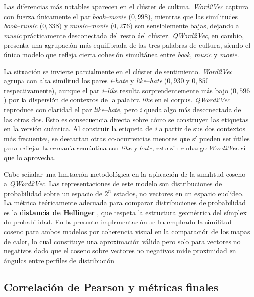 Las diferencias más notables aparecen en el clúster de cultura. \textit{Word2Vec} captura con fuerza únicamente el par \textit{book}--\textit{movie} ($0{,}998$), mientras que las similitudes \textit{book}--\textit{music} ($0{,}338$) y \textit{music}--\textit{movie} ($0{,}276$) son sensiblemente bajas, dejando a \textit{music} prácticamente desconectada del resto del clúster. \textit{QWord2Vec}, en cambio, presenta una agrupación más equilibrada de las tres palabras de cultura, siendo el único modelo que refleja cierta cohesión simultánea entre \textit{book}, \textit{music} y \textit{movie}.

La situación se invierte parcialmente en el clúster de sentimiento. \textit{Word2Vec} agrupa con alta similitud los pares \textit{i}--\textit{hate} y \textit{like}--\textit{hate} ($0{,}930$ y $0{,}850$ respectivamente), aunque el par \textit{i}--\textit{like} resulta sorprendentemente más bajo ($0{,}596$) por la dispersión de contextos de la palabra \textit{like} en el corpus. \textit{QWord2Vec} reproduce con claridad el par \textit{like}--\textit{hate}, pero \textit{i} queda algo más desconectada de las otras dos. Esto es consecuencia directa sobre cómo se construyen las etiquetas en la versión cuántica. Al construir la etiqueta de \textit{i} a partir de sus dos contextos más frecuentes, se descartan otras co-ocurrencias menores que sí pueden ser útiles para reflejar la cercanía semántica con \textit{like} y \textit{hate}, esto sin embargo \textit{Word2Vec} sí que lo aprovecha.

Cabe señalar una limitación metodológica en la aplicación de la similitud coseno a \textit{QWord2Vec}. Las representaciones de este modelo son distribuciones de probabilidad sobre un espacio de $2^n$ estados, no vectores en un espacio euclídeo. La métrica teóricamente adecuada para comparar distribuciones de probabilidad es la \textbf{distancia de Hellinger} \cite{oecd_hellinger_distance}, que respeta la estructura geométrica del símplex de probabilidad. En la presente implementación se ha empleado la similitud coseno para ambos modelos por coherencia visual en la comparación de los mapas de calor, lo cual constituye una aproximación válida pero solo para vectores no negativos dado que el coseno sobre vectores no negativos mide proximidad en ángulos entre perfiles de distribución.

\subsection{Correlación de Pearson y métricas finales}

